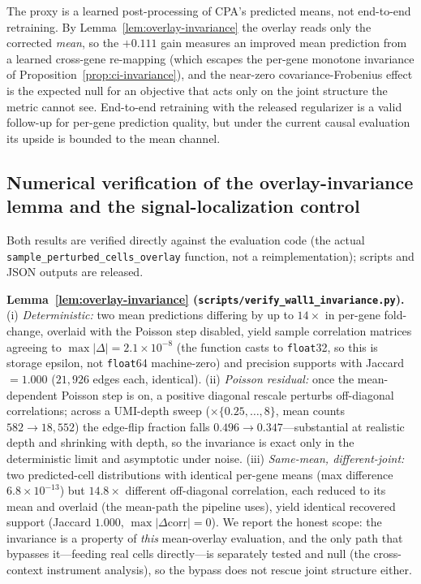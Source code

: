 \documentclass{article}
\theoremstyle{plain}
\theoremstyle{definition}
\theoremstyle{remark}
\begin{document}
The proxy is a learned post-processing of CPA's predicted means, not end-to-end retraining. By Lemma~\ref{lem:overlay-invariance} the overlay reads only the corrected \emph{mean}, so the $+0.111$ gain measures an improved mean prediction from a learned cross-gene re-mapping (which escapes the per-gene monotone invariance of Proposition~\ref{prop:ci-invariance}), and the near-zero covariance-Frobenius effect is the expected null for an objective that acts only on the joint structure the metric cannot see. End-to-end retraining with the released regularizer is a valid follow-up for per-gene prediction quality, but under the current causal evaluation its upside is bounded to the mean channel.

\subsection{Numerical verification of the overlay-invariance lemma and the signal-localization control}
\label{app:overlay-invariance}
Both results are verified directly against the evaluation code (the actual \texttt{sample\_perturbed\_cells\_overlay} function, not a reimplementation); scripts and JSON outputs are released.

\textbf{Lemma~\ref{lem:overlay-invariance} (\texttt{scripts/verify\_wall1\_invariance.py}).} (i) \emph{Deterministic:} two mean predictions differing by up to $14\times$ in per-gene fold-change, overlaid with the Poisson step disabled, yield sample correlation matrices agreeing to $\max|\Delta| = 2.1\times10^{-8}$ (the function casts to \texttt{float}32, so this is storage epsilon, not \texttt{float}64 machine-zero) and precision supports with Jaccard $= 1.000$ ($21{,}926$ edges each, identical). (ii) \emph{Poisson residual:} once the mean-dependent Poisson step is on, a positive diagonal rescale perturbs off-diagonal correlations; across a UMI-depth sweep ($\times\{0.25,\dots,8\}$, mean counts $582 \to 18{,}552$) the edge-flip fraction falls $0.496 \to 0.347$---substantial at realistic depth and shrinking with depth, so the invariance is exact only in the deterministic limit and asymptotic under noise. (iii) \emph{Same-mean, different-joint:} two predicted-cell distributions with identical per-gene means (max difference $6.8\times10^{-13}$) but $14.8\times$ different off-diagonal correlation, each reduced to its mean and overlaid (the mean-path the pipeline uses), yield identical recovered support (Jaccard $1.000$, $\max|\Delta\mathrm{corr}| = 0$). We report the honest scope: the invariance is a property of \emph{this} mean-overlay evaluation, and the only path that bypasses it---feeding real cells directly---is separately tested and null (the cross-context instrument analysis), so the bypass does not rescue joint structure either.
\end{document}
